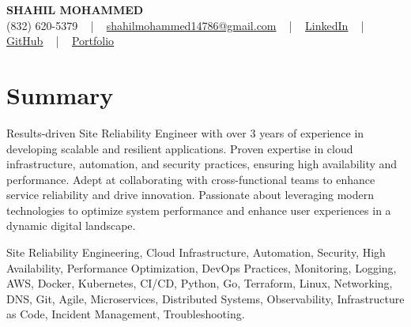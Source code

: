 \documentclass[letterpaper,10pt]{article}
\begin{document}
\begin{center}
    {\fontsize{14pt}{12pt}\selectfont \textbf{\MakeUppercase{Shahil Mohammed}}}\\ \vspace{2pt}
    \fontsize{10pt}{12pt}\selectfont (832) 620-5379 ~ | ~ \href{mailto:shahilmohammed14786@gmail.com}{shahilmohammed14786@gmail.com} ~ | ~  
    \href{https://www.linkedin.com/in/shahil-mohammed-9652931a1/}{\color{blue}\underline{LinkedIn}}  ~ | ~ 
    \href{https://github.com/freakbeast14}{\color{blue}\underline{GitHub}} ~ | ~ 
    \href{https://shahil-mohammed.netlify.app/}{\color{blue}\underline{Portfolio}}
    \vspace{-8pt}
\end{center}

\section{Summary}
\vspace{-2pt}\fontsize{8pt}{9pt}\selectfont
Results-driven Site Reliability Engineer with over 3 years of experience in developing scalable and resilient applications. Proven expertise in cloud infrastructure, automation, and security practices, ensuring high availability and performance. Adept at collaborating with cross-functional teams to enhance service reliability and drive innovation. Passionate about leveraging modern technologies to optimize system performance and enhance user experiences in a dynamic digital landscape.
 \vspace{-5pt}
 
{\fontsize{1pt}{1pt}\selectfont\color{white}
Site Reliability Engineering, Cloud Infrastructure, Automation, Security, High Availability, Performance Optimization, DevOps Practices, Monitoring, Logging, AWS, Docker, Kubernetes, CI/CD, Python, Go, Terraform, Linux, Networking, DNS, Git, Agile, Microservices, Distributed Systems, Observability, Infrastructure as Code, Incident Management, Troubleshooting.
}
\vspace{-8pt}

\vspace{-2pt}
\end{document}
